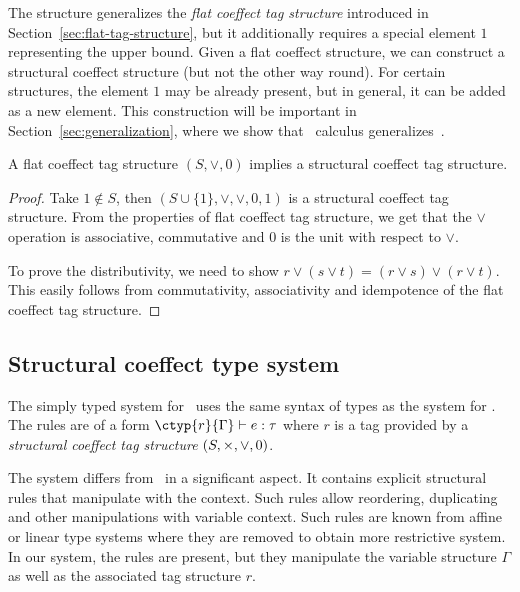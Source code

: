 The structure generalizes the \emph{flat coeffect tag structure} introduced in 
Section~\ref{sec:flat-tag-structure}, but it additionally requires a special element $1$ 
representing the upper bound. Given a flat coeffect structure, we can construct a structural
coeffect structure (but not the other way round). For certain structures, the element $1$
may be already present, but in general, it can be added as a new element.
This construction will be important in Section~\ref{sec:generalization},
where we show that \clstr~calculus generalizes~\clflt.

\begin{lemma}
\label{thm:structural-generalizaton}
A flat coeffect tag structure $(S, \vee, 0)$ implies a structural coeffect tag structure.
\end{lemma}
\begin{proof}
Take $1 \notin S$, then $(S \cup \{1\}, \vee, \vee, 0, 1)$ is a structural coeffect tag 
structure. From the properties of flat coeffect tag structure, we get that the $\vee$ operation 
is associative, commutative and $0$ is the unit with respect to $\vee$.

To prove the distributivity, we need to show $r \vee (s \vee t) = (r \vee s) \vee (r \vee t)$.
This easily follows from commutativity, associativity and idempotence of the flat coeffect tag 
structure.
\end{proof}


\subsection{Structural coeffect type system}
\label{sec:structural-types}

The simply typed system for \clstr~uses the same syntax of types as the system for \clflt. 
The rules are of a form $\ctyp{r}{\Gamma}\vdash e : \tau$ where $r$ is a tag provided by 
a \emph{structural coeffect tag structure} $(S,\times, \vee, 0)$.

The system differs from \clflt~in a significant aspect. It contains explicit 
structural rules that manipulate with the context. Such rules allow reordering, duplicating
and other manipulations with variable context. Such rules are known from affine or linear
type systems where they are removed to obtain more restrictive system. In our system, the
rules are present, but they manipulate the variable structure $\Gamma$ as well as the 
associated tag structure $r$.

